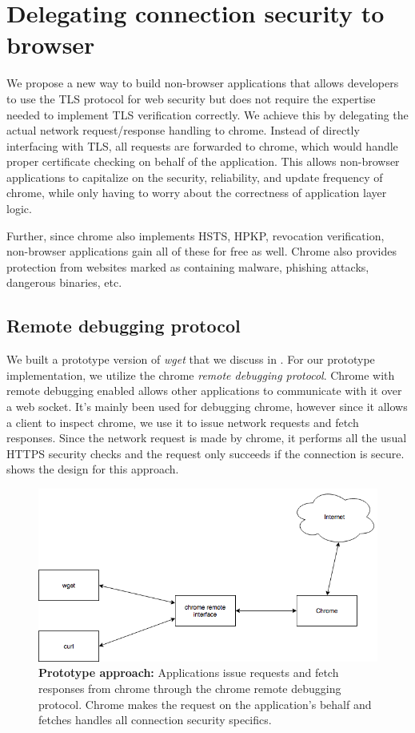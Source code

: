 \section{Delegating connection security to browser}
\label{sec:solution-saber}

We propose a new way to build non-browser applications that allows developers
to use the TLS protocol for web security but does not require the expertise
needed to implement TLS verification correctly. We achieve this by delegating
the actual network request/response handling to chrome. Instead of directly
interfacing with TLS, all requests are forwarded to chrome, which would handle
proper certificate checking on behalf of the application. This allows
non-browser applications to capitalize on the security, reliability, and update
frequency of chrome, while only having to worry about the correctness of
application layer logic.

Further, since chrome also implements HSTS, HPKP, revocation verification,
non-browser applications gain all of these for free as well. Chrome also
provides protection from websites marked as containing malware, phishing
attacks, dangerous binaries, etc.

\subsection{Remote debugging protocol}
We built a prototype version of \emph{wget} that we discuss in
. For our prototype implementation, we utilize the chrome
\emph{remote debugging protocol}. Chrome with remote debugging enabled allows
other applications to communicate with it over a web socket. It's mainly been
used for debugging chrome, however since it allows a client to inspect chrome,
we use it to issue network requests and fetch responses. Since the network
request is made by chrome, it performs all the usual HTTPS security checks and
the request only succeeds if the connection is secure.
 shows the design for this approach.

\begin{figure}[h]
  \includegraphics[width=\textwidth]{figures/prototype}
  \caption[Prototype approach]{\textbf{Prototype approach:} Applications issue
  requests and fetch responses from chrome through the chrome remote debugging
  protocol. Chrome makes the request on the application's behalf and fetches
  handles all connection security specifics.}
  \label{fig:prototype-saber}
\end{figure}

